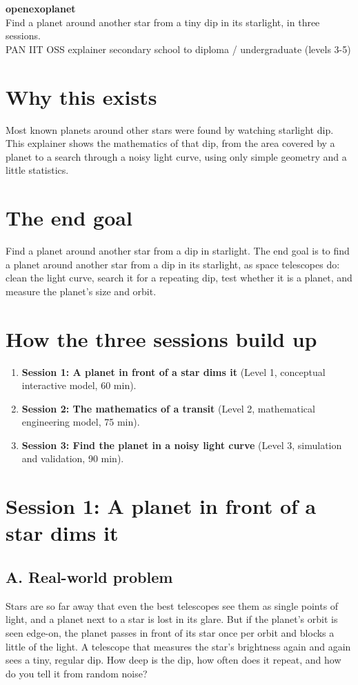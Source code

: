 \documentclass[11pt,a4paper]{article}
\begin{document}
\begin{center}{\LARGE\bfseries openexoplanet}\\[0.4em]{\large Find a planet around another star from a tiny dip in its starlight, in three sessions.}\\[0.2em]\small PAN IIT OSS explainer \textbullet{} secondary school to diploma / undergraduate (levels 3-5)\end{center}

\section*{Why this exists}
Most known planets around other stars were found by watching starlight dip. This explainer shows the mathematics of that dip, from the area covered by a planet to a search through a noisy light curve, using only simple geometry and a little statistics.

\section*{The end goal}
Find a planet around another star from a dip in starlight. The end goal is to find a planet around another star from a dip in its starlight, as space telescopes do: clean the light curve, search it for a repeating dip, test whether it is a planet, and measure the planet's size and orbit.

\section*{How the three sessions build up}
\begin{enumerate}[nosep]
\item \textbf{Session 1: A planet in front of a star dims it} (Level 1, conceptual interactive model, 60 min).
\item \textbf{Session 2: The mathematics of a transit} (Level 2, mathematical engineering model, 75 min).
\item \textbf{Session 3: Find the planet in a noisy light curve} (Level 3, simulation and validation, 90 min).
\end{enumerate}

\section{Session 1: A planet in front of a star dims it}

\subsection*{A. Real-world problem}
Stars are so far away that even the best telescopes see them as single points of light, and a planet next to a star is lost in its glare. But if the planet's orbit is seen edge-on, the planet passes in front of its star once per orbit and blocks a little of the light. A telescope that measures the star's brightness again and again sees a tiny, regular dip. How deep is the dip, how often does it repeat, and how do you tell it from random noise?
\end{document}
